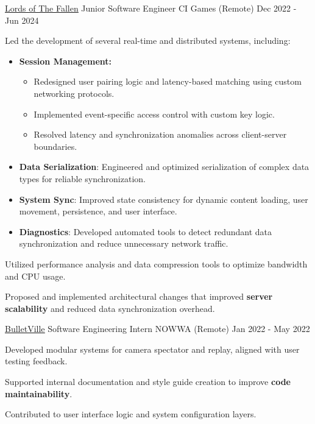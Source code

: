 \begin{cventries}
  \cventry
    {\href{https://wizardcell.com/about/lords-of-the-fallen}{\underline{Lords of The Fallen}}}
    {Junior Software Engineer}
    {CI Games (Remote)}
    {Dec 2022 - Jun 2024}
    {
      \begin{cvitems}
        \item {Led the development of several real-time and distributed systems, including:
          \begin{itemize}
            \item {\textbf{Session Management:}
              \begin{itemize}
                \item {Redesigned user pairing logic and latency-based matching using custom networking protocols.}
                \item {Implemented event-specific access control with custom key logic.}
                \item {Resolved latency and synchronization anomalies across client-server boundaries.}
              \end{itemize}
            }
            \item {\textbf{Data Serialization}: Engineered and optimized serialization of complex data types for reliable synchronization.}
            \item {\textbf{System Sync}: Improved state consistency for dynamic content loading, user movement, persistence, and user interface.}
            \item {\textbf{Diagnostics}: Developed automated tools to detect redundant data synchronization and reduce unnecessary network traffic.}
          \end{itemize}
        }
        \item {Utilized performance analysis and data compression tools to optimize bandwidth and CPU usage.}
        \item {Proposed and implemented architectural changes that improved \textbf{server scalability} and reduced data synchronization overhead.}
      \end{cvitems}
    }

  \cventry
    {\href{https://wizardcell.com/about/bulletville}{\underline{BulletVille}}}
    {Software Engineering Intern}
    {NOWWA (Remote)}
    {Jan 2022 - May 2022}
    {
      \begin{cvitems}
        \item {Developed modular systems for camera spectator and replay, aligned with user testing feedback.}
        \item {Supported internal documentation and style guide creation to improve \textbf{code maintainability}.}
        \item {Contributed to user interface logic and system configuration layers.}
      \end{cvitems}
    }


\end{cventries}
